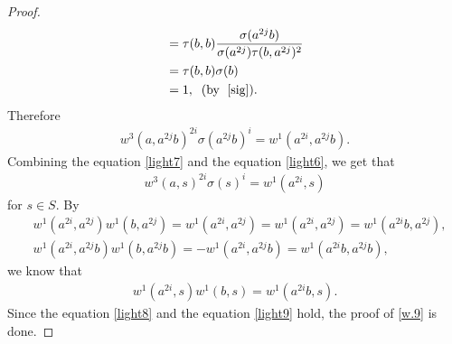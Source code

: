 \documentclass[a4paper,11pt]{amsart}
\numberwithin{equation}{section}
\begin{document}
\begin{proof}
\begin{align*}
&=\tau(b,b) \frac{\sigma(a^{2j}b)}{\sigma(a^{2j}) \tau(b,a^{2j})^2}\\
&=\tau(b,b) \sigma(b)\\
&=1,\;\;(\text{by }\;\eqref{sig}).
\end{align*}
Therefore
\begin{align}
\label{light6} w^3(a,a^{2j}b)^{2i} \sigma(a^{2j}b)^i=w^1(a^{2i},a^{2j}b).
\end{align}
 Combining the equation \eqref{light7} and the equation \eqref{light6}, we get that
\begin{align}
\label{light8}w^3(a,s)^{2i} \sigma(s)^i=w^1(a^{2i},s)
\end{align}
for $s\in S.$ By
\begin{align*}
&w^1(a^{2i},a^{2j}) w^1(b,a^{2j})=w^1(a^{2i},a^{2j})=w^1(a^{2i},a^{2j})=w^1(a^{2i}b,a^{2j}),\\
&w^1(a^{2i},a^{2j}b) w^1(b,a^{2j}b)=-w^1(a^{2i},a^{2j}b)=w^1(a^{2i}b,a^{2j}b),
\end{align*}
 we know that
\begin{align}
\label{light9}w^1(a^{2i},s) w^1(b,s)=w^1(a^{2i}b,s).
\end{align}
Since the equation \eqref{light8} and the equation \eqref{light9} hold, the proof of  \eqref{w.9} is done.


\end{proof}
\end{document}
